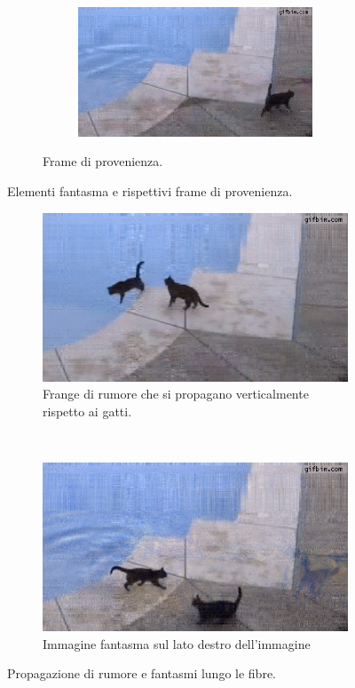 \documentclass[11pt,a4paper]{article}
\begin{document}
\begin{figure}
\begin{subfigure}[]{\wid\textwidth}
    \begin{subfigure}[]{\wid\textwidth}
      \centering
      \includegraphics[keepaspectratio=true, scale=\scal]{Imgs/Cats/frame-113}
    \end{subfigure}
    \caption{Frame di provenienza.}\label{fig:cats_sequence_phantoms_comp}
  \end{subfigure}
  \caption{Elementi fantasma e rispettivi frame di provenienza.}
\end{figure}

\begin{figure}
  \def\wid{0.48}
  \def\scal{0.44}
  \begin{subfigure}[]{\wid\textwidth}
    \includegraphics[keepaspectratio=true, scale=\scal]{Imgs/Cats/frame-62}
    \caption{Frange di rumore che si propagano verticalmente rispetto ai gatti.}\label{fig:cats_noise_vertical}
  \end{subfigure}
  ~
  \begin{subfigure}[]{\wid\textwidth}
    \includegraphics[keepaspectratio=true, scale=\scal]{Imgs/Cats/frame-94}
    \caption{Immagine fantasma sul lato destro dell'immagine}\label{fig:cats_noise_time}
  \end{subfigure}
  \caption{Propagazione di rumore e fantasmi lungo le fibre.}\label{fig:cats_noise}
\end{figure}
\end{document}
